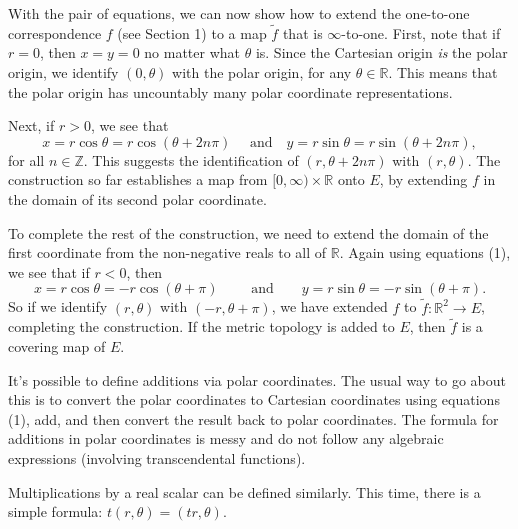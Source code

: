 \documentclass[12pt]{article}
\begin{document}
With the pair of equations, we can now show how to extend the
one-to-one correspondence $f$ (see Section 1) to a map
$\widetilde{f}$ that is $\infty$-to-one. First, note that if $r=0$,
then $x=y=0$ no matter what $\theta$ is. Since the Cartesian origin
\emph{is} the polar origin, we identify $(0,\theta)$ with the polar
origin, for any $\theta\in\mathbb{R}$. This means that the polar
origin has uncountably many polar coordinate representations.

Next, if $r>0$, we see that $$x=r\cos\theta=r\cos(\theta+2n\pi)\quad
\mbox{ and} \quad y=r\sin\theta=r\sin(\theta+2n\pi),$$ for all
$n\in\mathbb{Z}$. This suggests the identification of
$(r,\theta+2n\pi)$ with $(r,\theta)$. The construction so far
establishes a map from $[0,\infty)\times\mathbb{R}$ onto $E$, by
extending $f$ in the domain of its second polar coordinate.

To complete the rest of the construction, we need to extend the
domain of the first coordinate from the non-negative reals to all of
$\mathbb{R}$. Again using equations (1), we see that if $r<0$, then
$$x=r\cos\theta=-r\cos(\theta+\pi)\qquad \mbox{ and}
\qquad y=r\sin\theta=-r\sin(\theta+\pi).$$ So if we identify
$(r,\theta)$ with $(-r,\theta+\pi)$, we have extended $f$ to
$\widetilde{f}:\mathbb{R}^2\to E$, completing the construction. If
the metric topology is added to $E$, then $\widetilde{f}$ is a
covering map of $E$.

It's possible to define additions via polar coordinates. The usual
way to go about this is to convert the polar coordinates to
Cartesian coordinates using equations (1), add, and then convert the
result back to polar coordinates. The formula for additions in polar
coordinates is messy and do not follow any algebraic expressions
(involving transcendental functions).

Multiplications by a real scalar can be defined similarly. This
time, there is a simple formula: $t(r,\theta)=(tr,\theta)$.
\end{document}
